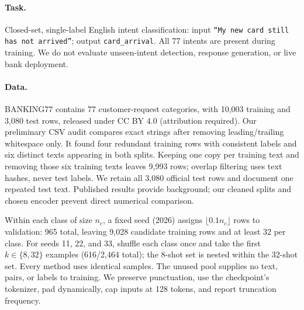 \documentclass{article}
\begin{document}
\paragraph{Task.}
Closed-set, single-label English intent classification: input \texttt{``My new card still has not arrived''}; output \texttt{card\_arrival}. All 77 intents are present during training. We do not evaluate unseen-intent detection, response generation, or live bank deployment.

\paragraph{Data.}
BANKING77 \cite{casanueva2020intent,bankinghub} contains 77 customer-request categories, with 10,003 training and 3,080 test rows, released under CC BY 4.0 (attribution required). Our preliminary CSV audit compares exact strings after removing leading/trailing whitespace only. It found four redundant training rows with consistent labels and six distinct texts appearing in both splits. Keeping one copy per training text and removing those six training texts leaves 9,993 rows; overlap filtering uses text hashes, never test labels. We retain all 3,080 official test rows and document one repeated test text. Published results provide background; our cleaned splits and chosen encoder prevent direct numerical comparison.

Within each class of size $n_c$, a fixed seed (2026) assigns $\lfloor0.1n_c\rfloor$ rows to validation: 965 total, leaving 9,028 candidate training rows and at least 32 per class. For seeds 11, 22, and 33, shuffle each class once and take the first $k\in\{8,32\}$ examples (616/2,464 total); the 8-shot set is nested within the 32-shot set. Every method uses identical samples. The unused pool supplies no text, pairs, or labels to training. We preserve punctuation, use the checkpoint's tokenizer, pad dynamically, cap inputs at 128 tokens, and report truncation frequency.
\end{document}
